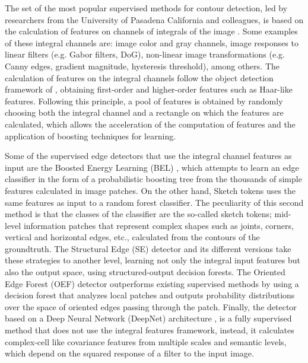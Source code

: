 The set of the most popular supervised methods for contour detection, led by researchers from the University of Pasadena California and colleagues, is based on the calculation of features on channels of integrals of the image \citep{Dollar.Tu.ea:BMVC:2009}. Some examples of these integral channels are: image color and gray channels, image responses to linear filters (e.g. Gabor filters, DoG), non-linear image transformations (e.g. Canny edges, gradient magnitude, hysteresis threshold), among others. The calculation of features on the integral channels follow the object detection framework of \cite{Viola.Jones:IJCV:2004}, obtaining first-order and higher-order features such as Haar-like features. Following this principle, a pool of features is obtained by randomly choosing both the integral channel and a rectangle on which the features are calculated, which allows the acceleration of the computation of features and the application of boosting techniques for learning.

Some of the supervised edge detectors that use the integral channel features as input are the Boosted Energy Learning (BEL) \citep{Dollar.ZhuowenTu.ea:CVPR:2006}, which attempts to learn an edge classifier in the form of a probabilistic boosting tree from the thousands of simple features calculated in image patches. On the other hand, Sketch tokens \citep{Lim.Zitnick.ea:CVPR:2013} uses the same features as input to a random forest classifier. The peculiarity of this second method is that the classes of the classifier are the so-called sketch tokens; mid-level information patches that represent complex shapes such as joints, corners, vertical and horizontal edges, etc., calculated from the contours of the groundtruth. The Structural Edge (SE) detector \citep{Dollar.Zitnick:ICCV:2013} and its different versions \citep{Dollar.Zitnick:PAMI:2015} take these strategies to another level, learning not only the integral input features but also the output space, using structured-output decision forests. The Oriented Edge Forest (OEF) detector \citep{Hallman.Fowlkes:CVPR:2015} outperforms existing supervised methods by using a decision forest that analyzes local patches and outputs probability distributions over the space of oriented edges passing through the patch. Finally, the detector based on a Deep Neural Network (DeepNet) architecture \citep{Kivinen.Williams.ea:PMLR:2014}, is a fully supervised method that does not use the integral features framework, instead, it calculates complex-cell like covariance features from multiple scales and semantic levels, which depend on the squared response of a filter to the input image.

